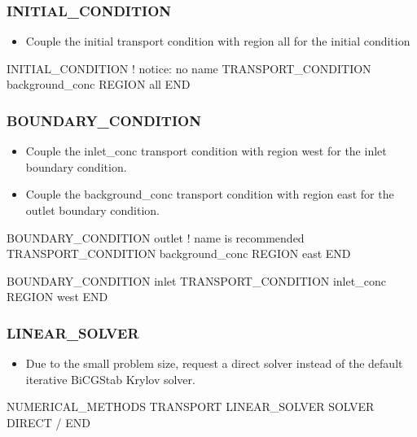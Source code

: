\documentclass{beamer}
\newcommand\redcomment[1]{{{\color{red} #1}}}
\newcommand\bluecomment[1]{{{\color{blue} #1}}}
\newcommand\greencomment[1]{{{\color{green} #1}}}
\begin{document}
\begin{frame}[fragile]\frametitle{INITIAL\_CONDITION}

\begin{itemize}
\item Couple the \greencomment{initial} transport condition with region \greencomment{all} for the initial condition
\end{itemize}

\begin{semiverbatim}

INITIAL_CONDITION          \bluecomment{! notice: no name}
  TRANSPORT_CONDITION background_conc
  REGION all
END

\end{semiverbatim}

\end{frame}

\begin{frame}[fragile]\frametitle{BOUNDARY\_CONDITION}

\begin{itemize}
\item Couple the \greencomment{inlet\_conc} transport condition with region \greencomment{west} for the \redcomment{inlet} boundary condition.
\item Couple the \greencomment{background\_conc} transport condition with region \greencomment{east} for the \redcomment{outlet} boundary condition.
\end{itemize}

\begin{semiverbatim}

BOUNDARY_CONDITION outlet     \bluecomment{! name is recommended}
  TRANSPORT_CONDITION background_conc
  REGION east
END

BOUNDARY_CONDITION inlet
  TRANSPORT_CONDITION inlet_conc
  REGION west
END

\end{semiverbatim}

\end{frame}

\begin{frame}[fragile]\frametitle{LINEAR\_SOLVER}

\begin{itemize}
\item Due to the small problem size, request a direct solver instead of the default iterative BiCGStab Krylov solver.
\end{itemize}

\begin{semiverbatim}

NUMERICAL_METHODS TRANSPORT
  LINEAR_SOLVER
    SOLVER DIRECT
  /
END

\end{semiverbatim}

\end{frame}
\end{document}
